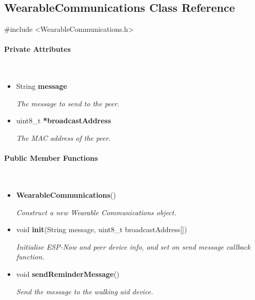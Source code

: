 \subsection{WearableCommunications Class Reference}
\label{subsec:WearableCommunications}\mbox{}

    \ttfamily{}

    \#include <WearableCommunications.h>\\

    \rmfamily{}

    \paragraph{Private Attributes}\mbox{}\\

        \begin{itemize}
            \item String \textbf{message}
            
                \quad \quad \textit{The message to send to the peer.}
                
            \item uint8\_t \textbf{*broadcastAddress}
            
                \quad \quad \textit{The MAC address of the peer.}\\

        \end{itemize}


    \paragraph{Public Member Functions}\mbox{}\\

        \begin{itemize}
            \item \textbf{WearableCommunications}() 
            
                \quad \quad \textit{Construct a new Wearable Communications object.}

            \item void \textbf{init}(String message, uint8\_t broadcastAddress[])
            
                \quad \quad \textit{Initialise ESP-Now and peer device info, and set on send message callback function.}
                
            \item void \textbf{sendReminderMessage}() 
            
                \quad \quad \textit{Send the message to the walking aid device.}\\

        \end{itemize}

